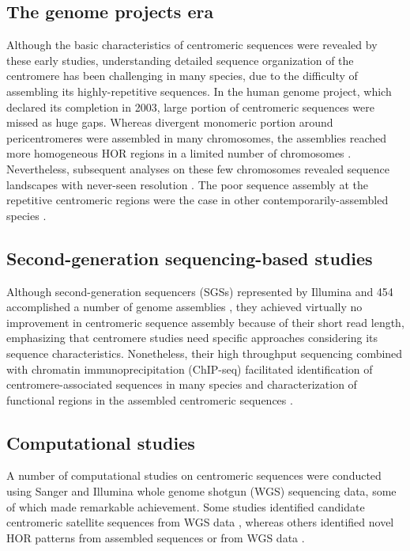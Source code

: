 \subsection*{The genome projects era}
  Although the basic characteristics of centromeric sequences were revealed by these early studies, understanding detailed sequence organization of the centromere has been challenging in many species, due to the difficulty of assembling its highly-repetitive sequences. In the human genome project, which declared its completion in 2003, large portion of centromeric sequences were missed as huge gaps. Whereas divergent monomeric portion around pericentromeres were assembled in many chromosomes, the assemblies reached more homogeneous HOR regions in a limited number of chromosomes \cite{M.KatharineRuddand2004, She2004}. Nevertheless, subsequent analyses on these few chromosomes revealed sequence landscapes with never-seen resolution \cite{Schueler2001, Ross2005, Nusbaum2006, Rudd2006}. The poor sequence assembly at the repetitive centromeric regions were the case in other contemporarily-assembled species \cite {Waterston2002, Hoskins2007}.


\subsection*{Second-generation sequencing-based studies}
  Although second-generation sequencers (SGSs) represented by Illumina and 454 accomplished a number of genome assemblies \cite{Schatz2010}, they achieved virtually no improvement in centromeric sequence assembly because of their short read length, emphasizing that centromere studies need specific approaches considering its sequence characteristics. Nonetheless, their high throughput sequencing combined with chromatin immunoprecipitation (ChIP-seq) facilitated identification of centromere-associated sequences in many species \cite{} and characterization of functional regions in the assembled centromeric sequences \cite{Hayden2013}.


\subsection*{Computational studies}
  A number of computational studies on centromeric sequences were conducted using Sanger and Illumina whole genome shotgun (WGS) sequencing data, some of which made remarkable achievement. Some studies identified candidate centromeric satellite sequences from WGS data \cite{Alkan2011, Melters2013}, whereas others identified novel HOR patterns from assembled sequences \cite{Rosandic2003} or from WGS data \cite{Alkan2007}.

